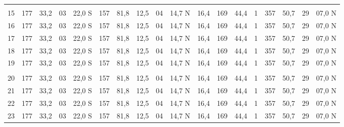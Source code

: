 \documentclass[a4paper]{article}
\begin{document}
\begin{center}
{\begin{tabular}{ c | c c | c c | c c | c | c c | c | c c | c | c c | c c}
       &     &      &    &        &     &      &      &    &        &      &     &      &   &     &      &    &        \\ 
    15 & 177 & 33,2 & 03 & 22,0 S & 157 & 81,8 & 12,5 & 04 & 14,7 N & 16,4 & 169 & 44,4 & 1 & 357 & 50,7 & 29 & 07,0 N \\ 
    16 & 177 & 33,2 & 03 & 22,0 S & 157 & 81,8 & 12,5 & 04 & 14,7 N & 16,4 & 169 & 44,4 & 1 & 357 & 50,7 & 29 & 07,0 N \\ 
    17 & 177 & 33,2 & 03 & 22,0 S & 157 & 81,8 & 12,5 & 04 & 14,7 N & 16,4 & 169 & 44,4 & 1 & 357 & 50,7 & 29 & 07,0 N \\ 
    18 & 177 & 33,2 & 03 & 22,0 S & 157 & 81,8 & 12,5 & 04 & 14,7 N & 16,4 & 169 & 44,4 & 1 & 357 & 50,7 & 29 & 07,0 N \\ 
    19 & 177 & 33,2 & 03 & 22,0 S & 157 & 81,8 & 12,5 & 04 & 14,7 N & 16,4 & 169 & 44,4 & 1 & 357 & 50,7 & 29 & 07,0 N \\ 
       &     &      &    &        &     &      &      &    &        &      &     &      &   &     &      &    &        \\ 
    20 & 177 & 33,2 & 03 & 22,0 S & 157 & 81,8 & 12,5 & 04 & 14,7 N & 16,4 & 169 & 44,4 & 1 & 357 & 50,7 & 29 & 07,0 N \\ 
    21 & 177 & 33,2 & 03 & 22,0 S & 157 & 81,8 & 12,5 & 04 & 14,7 N & 16,4 & 169 & 44,4 & 1 & 357 & 50,7 & 29 & 07,0 N \\ 
    22 & 177 & 33,2 & 03 & 22,0 S & 157 & 81,8 & 12,5 & 04 & 14,7 N & 16,4 & 169 & 44,4 & 1 & 357 & 50,7 & 29 & 07,0 N \\ 
    23 & 177 & 33,2 & 03 & 22,0 S & 157 & 81,8 & 12,5 & 04 & 14,7 N & 16,4 & 169 & 44,4 & 1 & 357 & 50,7 & 29 & 07,0 N \\ 
    \end{tabular}
    }
\end{center}
\end{document}
